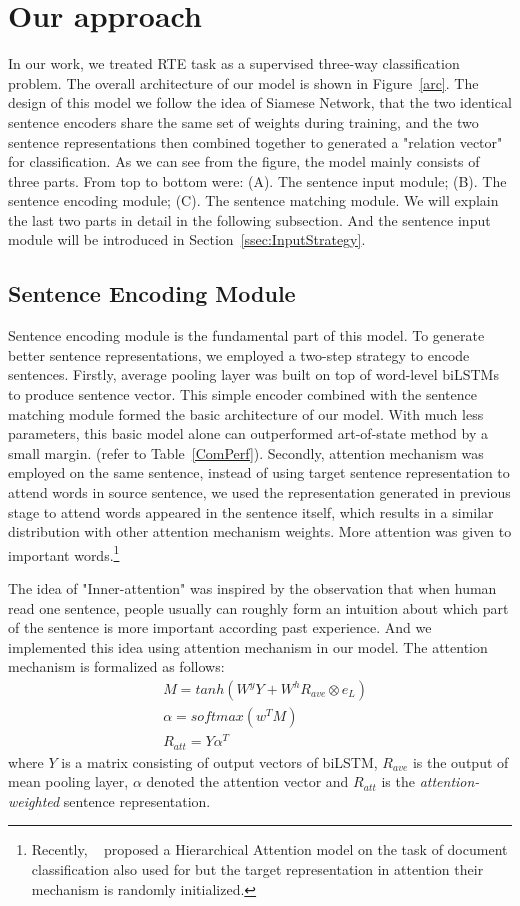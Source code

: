 \documentclass[11pt,letterpaper]{article}
\begin{document}
\section{Our approach}
In our work, we treated RTE task as a supervised three-way classification problem. The overall architecture of our model is shown in Figure~\ref{arc}. The design of this model we follow the idea of Siamese Network, that the two identical sentence encoders share the same set of weights during training, and the two sentence representations then combined together to generated a "relation vector" for classification. As we can see from the figure, the model mainly consists of three parts. From top to bottom were: (A). The sentence input module; (B). The sentence encoding module; (C). The sentence matching module. We will explain the last two parts in detail in the following subsection. And the sentence input module will be introduced in Section~\ref{ssec:InputStrategy}.

\subsection{Sentence Encoding Module}
Sentence encoding module is the fundamental part of this model. To generate better sentence representations, we employed a two-step strategy to encode sentences. Firstly, average pooling layer was built on top of word-level biLSTMs to produce sentence vector. This simple encoder combined with the sentence matching module formed the basic architecture of our model. With much less parameters, this basic model alone can outperformed art-of-state method by a small margin. (refer to Table~\ref{ComPerf}). Secondly, attention mechanism was employed on the same sentence, instead of using target sentence representation to attend words in source sentence, we used the representation generated in previous stage to attend words appeared in the sentence itself, which results in a similar distribution with other attention mechanism weights. More attention was given to important words.\footnote{Recently, ~\cite{yang2016hierarchical} proposed a Hierarchical Attention model on the task of document classification also used for but the target representation in attention their mechanism is randomly initialized.}

The idea of "Inner-attention" was inspired by the observation that when human read one sentence, people usually can roughly form an intuition about which part of the sentence is more important according past experience. And we implemented this idea using attention mechanism in our model. The attention mechanism is formalized as follows:
\begin{eqnarray*}
& M = tanh(W^yY + W^hR_{ave}\otimes e_L) \\
& \alpha = softmax(w^TM) \\
& R_{att} = Y\alpha^T
\end{eqnarray*}
where $Y$ is a matrix consisting of output vectors of biLSTM, $R_{ave}$ is the output of mean pooling layer, $\alpha$ denoted the attention vector and $R_{att}$ is the \emph{attention-weighted} sentence representation.
\end{document}
